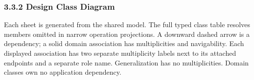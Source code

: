 \subsubsection*{3.3.2 Design Class Diagram}
Each sheet is generated from the shared model. The full typed class table resolves members omitted in narrow operation projections. A downward dashed arrow is a dependency; a solid domain association has multiplicities and navigability. Each displayed association has two separate multiplicity labels next to its attached endpoints and a separate role name. Generalization has no multiplicities. Domain classes own no application dependency.
